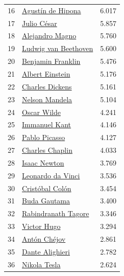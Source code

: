 \documentclass[../main.tex]{subfiles}
\begin{document}
\begin{longtable}{rlr}
16 & \href{https://en.wikipedia.org/wiki/Augustine_of_Hippo}{Agustín de Hipona} & 6.017 \\
17 & \href{https://en.wikipedia.org/wiki/Julius_Caesar}{Julio César} & 5.857 \\
18 & \href{https://en.wikipedia.org/wiki/Alexander_the_Great}{Alejandro Magno} & 5.760 \\
19 & \href{https://en.wikipedia.org/wiki/Ludwig_van_Beethoven}{Ludwig van Beethoven} & 5.600 \\
20 & \href{https://en.wikipedia.org/wiki/Benjamin_Franklin}{Benjamin Franklin} & 5.476 \\
21 & \href{https://en.wikipedia.org/wiki/Albert_Einstein}{Albert Einstein} & 5.176 \\
22 & \href{https://en.wikipedia.org/wiki/Charles_Dickens}{Charles Dickens} & 5.161 \\
23 & \href{https://en.wikipedia.org/wiki/Nelson_Mandela}{Nelson Mandela} & 5.104 \\
24 & \href{https://en.wikipedia.org/wiki/Oscar_Wilde}{Oscar Wilde} & 4.241 \\
25 & \href{https://en.wikipedia.org/wiki/Immanuel_Kant}{Immanuel Kant} & 4.146 \\
26 & \href{https://en.wikipedia.org/wiki/Pablo_Picasso}{Pablo Picasso} & 4.127 \\
27 & \href{https://en.wikipedia.org/wiki/Charlie_Chaplin}{Charles Chaplin} & 4.033 \\
28 & \href{https://en.wikipedia.org/wiki/Isaac_Newton}{Isaac Newton} & 3.769 \\
29 & \href{https://en.wikipedia.org/wiki/Leonardo_da_Vinci}{Leonardo da Vinci} & 3.536 \\
30 & \href{https://en.wikipedia.org/wiki/Christopher_Columbus}{Cristóbal Colón} & 3.454 \\
31 & \href{https://en.wikipedia.org/wiki/Gautama_Buddha}{Buda Gautama} & 3.400 \\
32 & \href{https://en.wikipedia.org/wiki/Rabindranath_Tagore}{Rabindranath Tagore} & 3.346 \\
33 & \href{https://en.wikipedia.org/wiki/Victor_Hugo}{Victor Hugo} & 3.294 \\
34 & \href{https://en.wikipedia.org/wiki/Anton_Chekhov}{Antón Chéjov} & 2.861 \\
35 & \href{https://en.wikipedia.org/wiki/Dante_Alighieri}{Dante Alighieri} & 2.782 \\
36 & \href{https://en.wikipedia.org/wiki/Nikola_Tesla}{Nikola Tesla} & 2.624 \\

\end{longtable}
\end{document}
